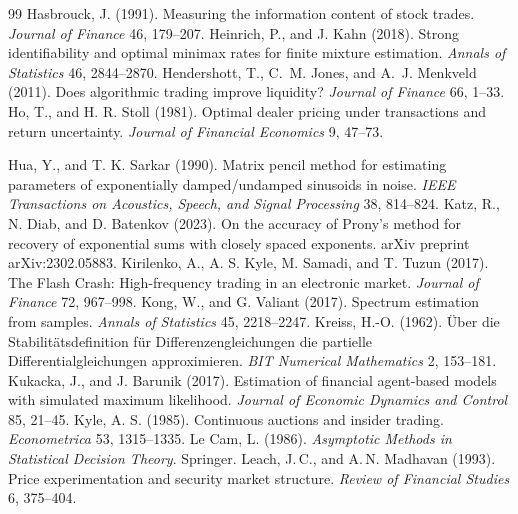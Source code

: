 \begin{thebibliography}{99}
 Hasbrouck, J. (1991). Measuring the information content of stock trades. \emph{Journal of Finance} 46, 179--207.
 Heinrich, P., and J. Kahn (2018). Strong identifiability and optimal minimax rates for finite mixture estimation. \emph{Annals of Statistics} 46, 2844--2870.
 Hendershott, T., C.~M. Jones, and A.~J. Menkveld (2011). Does algorithmic trading improve liquidity? \emph{Journal of Finance} 66, 1--33.
 Ho, T., and H. R. Stoll (1981). Optimal dealer pricing under transactions and return uncertainty. \emph{Journal of Financial Economics} 9, 47--73.

 Hua, Y., and T. K. Sarkar (1990). Matrix pencil method for estimating parameters of exponentially damped/undamped sinusoids in noise. \emph{IEEE Transactions on Acoustics, Speech, and Signal Processing} 38, 814--824.
 Katz, R., N. Diab, and D. Batenkov (2023). On the accuracy of Prony's method for recovery of exponential sums with closely spaced exponents. arXiv preprint arXiv:2302.05883.
 Kirilenko, A., A. S. Kyle, M. Samadi, and T. Tuzun (2017). The Flash Crash: High-frequency trading in an electronic market. \emph{Journal of Finance} 72, 967--998.
 Kong, W., and G. Valiant (2017). Spectrum estimation from samples. \emph{Annals of Statistics} 45, 2218--2247.
 Kreiss, H.-O. (1962). \"Uber die Stabilit\"atsdefinition f\"ur Differenzengleichungen die partielle Differentialgleichungen approximieren. \emph{BIT Numerical Mathematics} 2, 153--181.
 Kukacka, J., and J. Barunik (2017). Estimation of financial agent-based models with simulated maximum likelihood. \emph{Journal of Economic Dynamics and Control} 85, 21--45.
 Kyle, A. S. (1985). Continuous auctions and insider trading. \emph{Econometrica} 53, 1315--1335.
 Le Cam, L. (1986). \emph{Asymptotic Methods in Statistical Decision Theory}. Springer.
 Leach, J.\,C., and A.\,N. Madhavan (1993). Price experimentation and security market structure. \emph{Review of Financial Studies} 6, 375--404.


\end{thebibliography}
